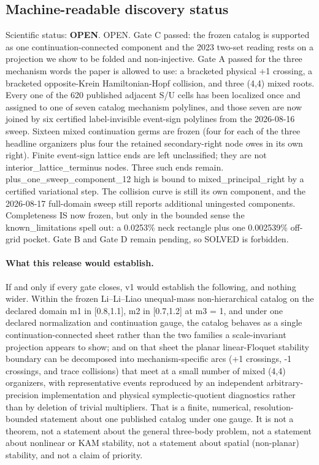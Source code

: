\subsection*{Machine-readable discovery status}
Scientific status: \textbf{OPEN}. OPEN. Gate C passed: the frozen catalog is supported as one continuation-connected component and the 2023 two-set reading rests on a projection we show to be folded and non-injective. Gate A passed for the three mechanism words the paper is allowed to use: a bracketed physical +1 crossing, a bracketed opposite-Krein Hamiltonian-Hopf collision, and three (4,4) mixed roots. Every one of the 620 published adjacent S/U cells has been localized once and assigned to one of seven catalog mechanism polylines, and those seven are now joined by six certified label-invisible event-sign polylines from the 2026-08-16 sweep. Sixteen mixed continuation germs are frozen (four for each of the three headline organizers plus four the retained secondary-right node owes in its own right). Finite event-sign lattice ends are left unclassified; they are not interior\_lattice\_terminus nodes. Three such ends remain. plus\_one\_sweep\_component\_12 high is bound to mixed\_principal\_right by a certified variational step. The collision curve is still its own component, and the 2026-08-17 full-domain sweep still reports additional uningested components. Completeness IS now frozen, but only in the bounded sense the known\_limitations spell out: a 0.0253\% neck rectangle plus one 0.002539\% off-grid pocket. Gate B and Gate D remain pending, so SOLVED is forbidden.
\paragraph{What this release would establish.}
If and only if every gate closes, v1 would establish the following, and nothing wider. Within the frozen Li--Li--Liao unequal-mass non-hierarchical catalog on the declared domain m1 in [0.8,1.1], m2 in [0.7,1.2] at m3 = 1, and under one declared normalization and continuation gauge, the catalog behaves as a single continuation-connected sheet rather than the two families a scale-invariant projection appears to show; and on that sheet the planar linear-Floquet stability boundary can be decomposed into mechanism-specific arcs (+1 crossings, -1 crossings, and trace collisions) that meet at a small number of mixed (4,4) organizers, with representative events reproduced by an independent arbitrary-precision implementation and physical symplectic-quotient diagnostics rather than by deletion of trivial multipliers. That is a finite, numerical, resolution-bounded statement about one published catalog under one gauge. It is not a theorem, not a statement about the general three-body problem, not a statement about nonlinear or KAM stability, not a statement about spatial (non-planar) stability, and not a claim of priority.
